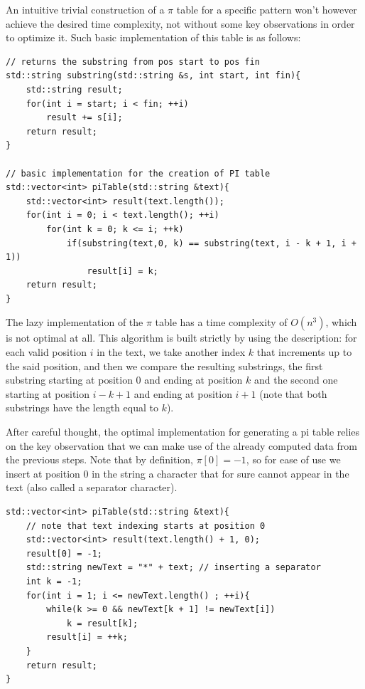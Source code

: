 \documentclass[letterpaper]{article}
\begin{document}

An intuitive trivial construction of a $\pi$ table for a specific pattern won't however achieve the desired time complexity, not without some key observations in order to optimize it. Such basic implementation of this table is as follows: 

\begin{lstlisting}
// returns the substring from pos start to pos fin
std::string substring(std::string &s, int start, int fin){
    std::string result;
    for(int i = start; i < fin; ++i)
        result += s[i];
    return result;
}

// basic implementation for the creation of PI table
std::vector<int> piTable(std::string &text){
    std::vector<int> result(text.length());
    for(int i = 0; i < text.length(); ++i)
        for(int k = 0; k <= i; ++k)
            if(substring(text,0, k) == substring(text, i - k + 1, i + 1))
                result[i] = k;
    return result;
}
\end{lstlisting}

The lazy implementation of the $\pi$ table has a time complexity of $O(n^3)$, which is not optimal at all. This algorithm is built strictly by using the description: for each valid position $i$ in the text, we take another index $k$ that increments up to the said position, and then we compare the resulting substrings, the first substring starting at position 0 and ending at position $k$ and the second one starting at position $i - k + 1$ and ending at position $i + 1$ (note that both substrings have the length equal to $k$). 

After careful thought, the optimal implementation for generating a pi table relies on the key observation that we can make use of the already computed data from the previous steps. Note that by definition, $\pi [0] = -1$, so for ease of use we insert at position 0 in the string a character that for sure cannot appear in the text (also called a separator character). 

\begin{lstlisting}
std::vector<int> piTable(std::string &text){
    // note that text indexing starts at position 0
    std::vector<int> result(text.length() + 1, 0);
    result[0] = -1;
    std::string newText = "*" + text; // inserting a separator
    int k = -1;
    for(int i = 1; i <= newText.length() ; ++i){
        while(k >= 0 && newText[k + 1] != newText[i])
            k = result[k];
        result[i] = ++k;
    }
    return result;
}
\end{lstlisting}
\end{document}
